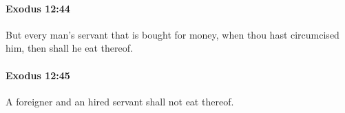 		\paragraph{Exodus 12:44} %
			\label{EXODUS-12-44}

			But every man's servant that is bought for money, when thou hast circumcised him, then shall he eat thereof.


		\paragraph{Exodus 12:45} %
			\label{EXODUS-12-45}

			A foreigner and an hired servant shall not eat thereof.


